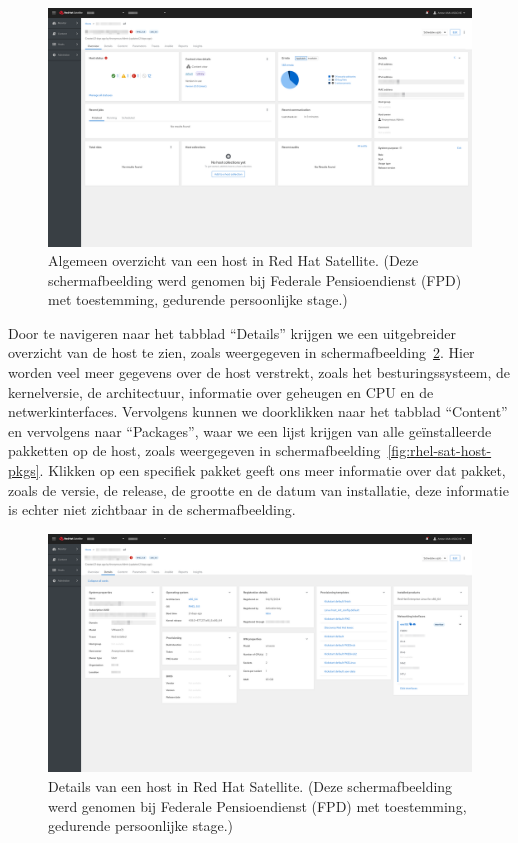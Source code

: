 \begin{figure}[h!]
    \includegraphics[width=\textwidth]
    {./graphics/state-of-the-art/rhel-satellite/rhel-sat-host-overview.png}
    \caption[Algemeen overzicht van host in Satellite.]{\label{fig:rhel-sat-host-overview}Algemeen overzicht van een host in Red Hat Satellite. (Deze schermafbeelding werd genomen bij Federale Pensioendienst (FPD) met toestemming, gedurende persoonlijke stage.)}
\end{figure}

Door te navigeren naar het tabblad ``Details'' krijgen we een uitgebreider overzicht van de host te zien, zoals weergegeven in schermafbeelding~\ref{fig:rhel-sat-host-details}.
Hier worden veel meer gegevens over de host verstrekt, zoals het besturingssysteem, de kernelversie, de architectuur, informatie over geheugen en CPU en de netwerkinterfaces.
Vervolgens kunnen we doorklikken naar het tabblad ``Content'' en vervolgens naar ``Packages'', waar we een lijst krijgen van alle ge\"installeerde pakketten op de host, zoals weergegeven in schermafbeelding~\ref{fig:rhel-sat-host-pkgs}.
Klikken op een specifiek pakket geeft ons meer informatie over dat pakket, zoals de versie, de release, de grootte en de datum van installatie, deze informatie is echter niet zichtbaar in de schermafbeelding.

\begin{figure}[h!]
    \includegraphics[width=\textwidth]
    {./graphics/state-of-the-art/rhel-satellite/rhel-sat-host-details.png}
    \caption[Details van host in Red Hat Satellite.]{\label{fig:rhel-sat-host-details}Details van een host in Red Hat Satellite. (Deze schermafbeelding werd genomen bij Federale Pensioendienst (FPD) met toestemming, gedurende persoonlijke stage.)}
\end{figure}

